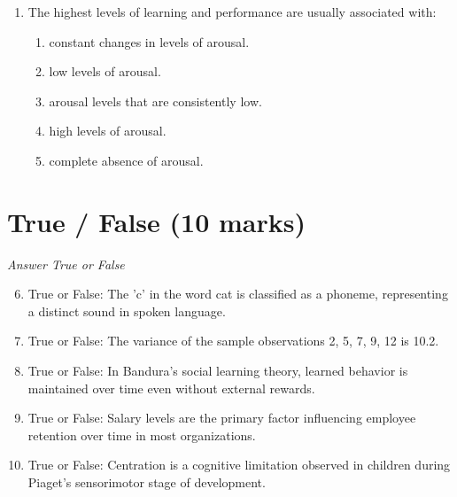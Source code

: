 \documentclass[12pt]{article}
\begin{document}
\begin{enumerate}[label=\arabic*.]
\begin{enumerate}[label=(\alph*)]
    \item that language is a uniquely human skill.
    \item the importance of physical contact to development.
    \item that primates have a hierarchy based on physical strength.
    \item that monkeys have a preference for inanimate objects.
    \item that primates can learn complex tasks.
\end{enumerate}
\item The highest levels of learning and performance are usually associated with:
\begin{enumerate}[label=(\alph*)]
    \item constant changes in levels of arousal.
    \item low levels of arousal.
    \item arousal levels that are consistently low.
    \item high levels of arousal.
    \item complete absence of arousal.
\end{enumerate}
\end{enumerate}

\section*{True / False (10 marks)}
\textit{Answer True or False}
\begin{enumerate}[label=\arabic*.]
\setcounter{enumi}{5}
\item True or False: The 'c' in the word cat is classified as a phoneme, representing a distinct sound in spoken language.
\item True or False: The variance of the sample observations 2, 5, 7, 9, 12 is 10.2.
\item True or False: In Bandura's social learning theory, learned behavior is maintained over time even without external rewards.
\item True or False: Salary levels are the primary factor influencing employee retention over time in most organizations.
\item True or False: Centration is a cognitive limitation observed in children during Piaget's sensorimotor stage of development.
\end{enumerate}
\end{document}
